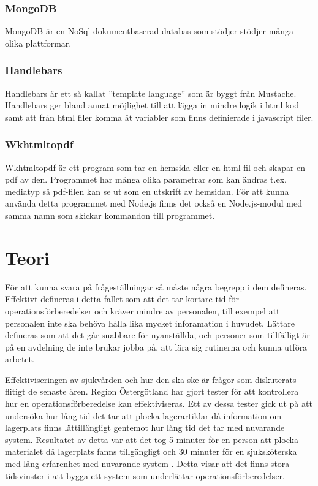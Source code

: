 \documentclass{article}
\begin{document}
\subsubsection{MongoDB}
MongoDB är en NoSql dokumentbaserad databas som stödjer stödjer många olika plattformar.

\subsubsection{Handlebars}
Handlebars är ett så kallat ''template language'' som är byggt från Mustache. Handlebars ger bland annat möjlighet till att lägga in mindre logik i html kod samt att från html filer komma åt variabler som finns definierade i javascript filer.

\subsubsection{Wkhtmltopdf}
Wkhtmltopdf är ett program som tar en hemsida eller en html-fil och skapar en pdf av den. Programmet har många olika parametrar som kan ändras t.ex. mediatyp så pdf-filen kan se ut som en utskrift av hemsidan. För att kunna använda detta programmet med Node.js finns det också en Node.js-modul med samma namn som skickar kommandon till programmet.


\section{Teori}
För att kunna svara på frågeställningar så måste några begrepp i dem defineras.
Effektivt defineras i detta fallet som att det tar kortare tid för operationsförberedelser och kräver mindre av personalen, till exempel att personalen inte ska behöva hålla lika mycket inforamation i huvudet. 
Lättare defineras som att det går snabbare för nyanställda, och personer som tillfälligt är på en avdelning de inte brukar jobba på, att lära sig rutinerna och kunna utföra arbetet.

Effektiviseringen av sjukvården och hur den ska ske är frågor som diskuterats flitigt de senaste åren. Region Östergötland har gjort tester för att kontrollera hur en operationsförberedelse kan effektiviseras. Ett av dessa tester gick ut på att undersöka hur lång tid det tar att plocka lagerartiklar då information om lagerplats finns lättillängligt gentemot hur lång tid det tar med nuvarande system. Resultatet av detta var att det tog 5 minuter för en person att plocka materialet då lagerplats fanns tillgängligt och 30 minuter för en sjuksköterska med lång erfarenhet med nuvarande system \cite{Elisabeth}. Detta visar att det finns stora tidsvinster i att bygga ett system som underlättar operationsförberedelser.
\end{document}
